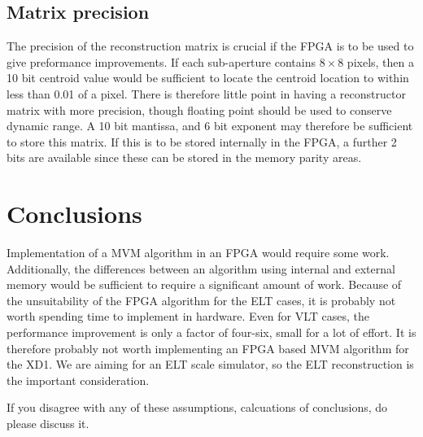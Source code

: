 \documentclass{article}
\begin{document}
\subsection{Matrix precision}
The precision of the reconstruction matrix is crucial if the FPGA is
to be used to give preformance improvements.  If each sub-aperture
contains $8\times8$ pixels, then a 10 bit centroid value would be
sufficient to locate the centroid location to within less than 0.01 of
a pixel.  There is therefore little point in having a reconstructor
matrix with more precision, though floating point should be used to
conserve dynamic range.  A 10 bit mantissa, and 6 bit exponent may
therefore be sufficient to store this matrix.  If this is to be stored
internally in the FPGA, a further 2 bits are available since these can
be stored in the memory parity areas.

\section{Conclusions}
Implementation of a MVM algorithm in an FPGA would require some work.
Additionally, the differences between an algorithm using internal and
external memory would be sufficient to require a significant amount of
work.  Because of the unsuitability of the FPGA algorithm for the
ELT cases, it is probably not worth spending time to implement in
hardware.  Even for VLT cases, the performance improvement is only a
factor of four-six, small for a lot of effort.  It is therefore
probably not worth implementing an FPGA based MVM algorithm for the
XD1.  We are aiming for an ELT scale simulator, so the ELT
reconstruction is the important consideration.

If you disagree with any of these assumptions, calcuations of
conclusions, do please discuss it.

\pagebreak



\printindex
\end{document}
